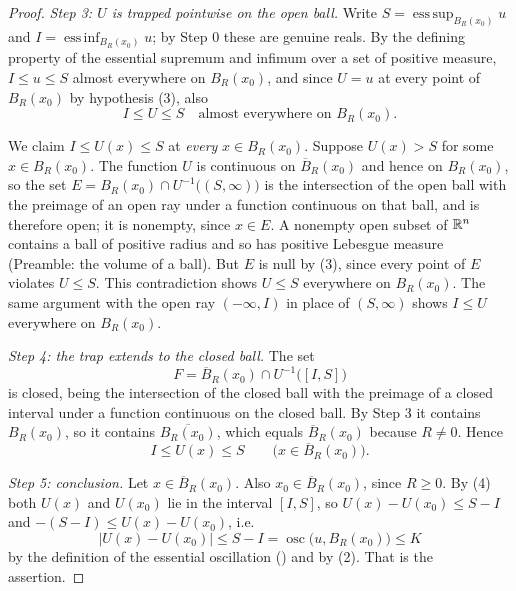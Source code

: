 \begin{proof}
\emph{Step 3: $U$ is trapped pointwise on the open ball.}  Write
$S=\operatorname{ess\,sup}_{B_R(x_0)}u$ and
$I=\operatorname{ess\,inf}_{B_R(x_0)}u$; by Step 0 these are genuine reals.  By
the defining property of the essential supremum and infimum over a set of
positive measure, $I\le u\le S$ almost everywhere on $B_R(x_0)$, and since
$U=u$ at every point of $B_R(x_0)$ by hypothesis (3), also
\[
I\le U\le S\quad\text{almost everywhere on }B_R(x_0).
\tag{3}
\]

We claim $I\le U(x)\le S$ at \emph{every} $x\in B_R(x_0)$.  Suppose
$U(x)>S$ for some $x\in B_R(x_0)$.  The function $U$ is continuous on
$\overline B_R(x_0)$ and hence on $B_R(x_0)$, so the set
$E=B_R(x_0)\cap U^{-1}\bigl((S,\infty)\bigr)$ is the intersection of the open
ball with the preimage of an open ray under a function continuous on that
ball, and is therefore open; it is nonempty, since $x\in E$.  A nonempty open
subset of $\mathbb{R}^n$ contains a ball of positive radius and so has positive
Lebesgue measure (Preamble: the volume of a ball).  But $E$ is null by (3),
since every point of $E$ violates $U\le S$.  This contradiction shows
$U\le S$ everywhere on $B_R(x_0)$.  The same argument with the open ray
$(-\infty,I)$ in place of $(S,\infty)$ shows $I\le U$ everywhere on
$B_R(x_0)$.

\emph{Step 4: the trap extends to the closed ball.}  The set
\[
F=\overline B_R(x_0)\cap U^{-1}\bigl([I,S]\bigr)
\]
is closed, being the intersection of the closed ball with the preimage of a
closed interval under a function continuous on the closed ball.  By Step 3 it
contains $B_R(x_0)$, so it contains $\overline{B_R(x_0)}$, which equals
$\overline B_R(x_0)$ because $R\ne0$.  Hence
\[
I\le U(x)\le S\qquad\bigl(x\in\overline B_R(x_0)\bigr).
\tag{4}
\]

\emph{Step 5: conclusion.}  Let $x\in\overline B_R(x_0)$.  Also
$x_0\in\overline B_R(x_0)$, since $R\ge0$.  By (4) both $U(x)$ and $U(x_0)$ lie
in the interval $[I,S]$, so $U(x)-U(x_0)\le S-I$ and
$-(S-I)\le U(x)-U(x_0)$, i.e.
\[
|U(x)-U(x_0)|\le S-I=\operatorname*{osc}\bigl(u,B_R(x_0)\bigr)\le K
\]
by the definition of the essential oscillation () and by (2).
That is the assertion.
\end{proof}
